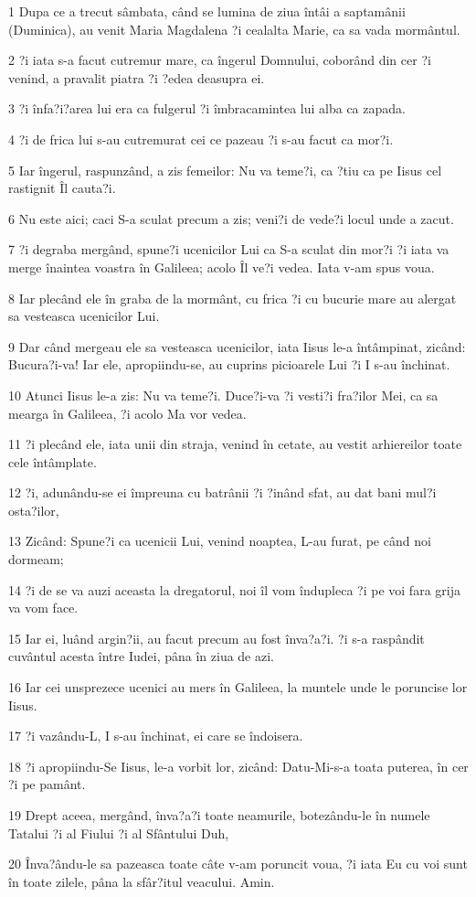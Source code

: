 \par 1 Dupa ce a trecut sâmbata, când se lumina de ziua întâi a saptamânii (Duminica), au venit Maria Magdalena ?i cealalta Marie, ca sa vada mormântul.
\par 2 ?i iata s-a facut cutremur mare, ca îngerul Domnului, coborând din cer ?i venind, a pravalit piatra ?i ?edea deasupra ei.
\par 3 ?i înfa?i?area lui era ca fulgerul ?i îmbracamintea lui alba ca zapada.
\par 4 ?i de frica lui s-au cutremurat cei ce pazeau ?i s-au facut ca mor?i.
\par 5 Iar îngerul, raspunzând, a zis femeilor: Nu va teme?i, ca ?tiu ca pe Iisus cel rastignit Îl cauta?i.
\par 6 Nu este aici; caci S-a sculat precum a zis; veni?i de vede?i locul unde a zacut.
\par 7 ?i degraba mergând, spune?i ucenicilor Lui ca S-a sculat din mor?i ?i iata va merge înaintea voastra în Galileea; acolo Îl ve?i vedea. Iata v-am spus voua.
\par 8 Iar plecând ele în graba de la mormânt, cu frica ?i cu bucurie mare au alergat sa vesteasca ucenicilor Lui.
\par 9 Dar când mergeau ele sa vesteasca ucenicilor, iata Iisus le-a întâmpinat, zicând: Bucura?i-va! Iar ele, apropiindu-se, au cuprins picioarele Lui ?i I s-au închinat.
\par 10 Atunci Iisus le-a zis: Nu va teme?i. Duce?i-va ?i vesti?i fra?ilor Mei, ca sa mearga în Galileea, ?i acolo Ma vor vedea.
\par 11 ?i plecând ele, iata unii din straja, venind în cetate, au vestit arhiereilor toate cele întâmplate.
\par 12 ?i, adunându-se ei împreuna cu batrânii ?i ?inând sfat, au dat bani mul?i osta?ilor,
\par 13 Zicând: Spune?i ca ucenicii Lui, venind noaptea, L-au furat, pe când noi dormeam;
\par 14 ?i de se va auzi aceasta la dregatorul, noi îl vom îndupleca ?i pe voi fara grija va vom face.
\par 15 Iar ei, luând argin?ii, au facut precum au fost înva?a?i. ?i s-a raspândit cuvântul acesta între Iudei, pâna în ziua de azi.
\par 16 Iar cei unsprezece ucenici au mers în Galileea, la muntele unde le poruncise lor Iisus.
\par 17 ?i vazându-L, I s-au închinat, ei care se îndoisera.
\par 18 ?i apropiindu-Se Iisus, le-a vorbit lor, zicând: Datu-Mi-s-a toata puterea, în cer ?i pe pamânt.
\par 19 Drept aceea, mergând, înva?a?i toate neamurile, botezându-le în numele  Tatalui ?i al Fiului ?i al Sfântului Duh,
\par 20 Înva?ându-le sa pazeasca toate câte v-am poruncit voua, ?i iata Eu cu voi sunt în toate zilele, pâna la sfâr?itul veacului. Amin.


